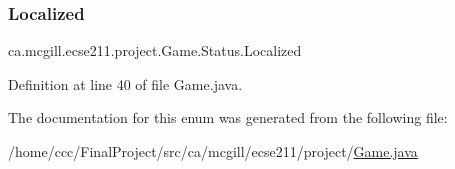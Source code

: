 \subsubsection{\texorpdfstring{Localized}{Localized}}
{\footnotesize\ttfamily ca.\+mcgill.\+ecse211.\+project.\+Game.\+Status.\+Localized}



Definition at line 40 of file Game.\+java.



The documentation for this enum was generated from the following file\+:\begin{DoxyCompactItemize}
\item 
/home/ccc/\+Final\+Project/src/ca/mcgill/ecse211/project/\hyperlink{_game_8java}{Game.\+java}\end{DoxyCompactItemize}
